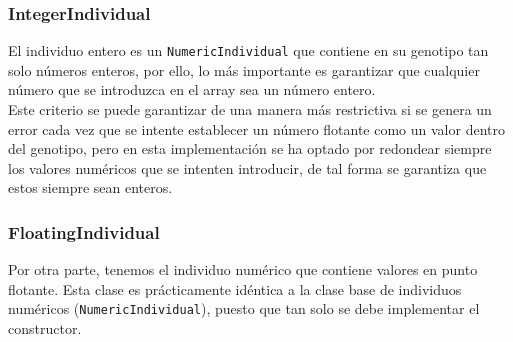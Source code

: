 \subsubsection{IntegerIndividual}

El individuo entero es un \texttt{NumericIndividual} que contiene en su genotipo tan solo números enteros, por ello, lo más importante es garantizar que cualquier número que se introduzca en el array sea un número entero. \\

Este criterio se puede garantizar de una manera más restrictiva si se genera un error cada vez que se intente establecer un número flotante como un valor dentro del genotipo, pero en esta implementación se ha optado por redondear siempre los valores numéricos que se intenten introducir, de tal forma se garantiza que estos siempre sean enteros.

\subsubsection{FloatingIndividual}

Por otra parte, tenemos el individuo numérico que contiene valores en punto flotante. Esta clase es prácticamente idéntica a la clase base de individuos numéricos (\texttt{NumericIndividual}), puesto que tan solo se debe implementar el constructor.
\label{4:sec:1}